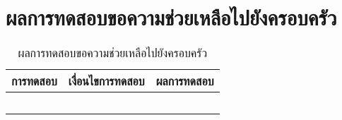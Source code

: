 \section{ผลการทดสอบขอความช่วยเหลือไปยังครอบครัว}
\begin{table}[H]
	\caption{ผลการทดสอบขอความช่วยเหลือไปยังครอบครัว}
    \centering	
	\label{tab:test14}
    \begin{tabular}{ | p{4cm} | p{4cm} | p{4cm} |  }
		\hline
	\multicolumn{1}{|c|}{การทดสอบ} & \multicolumn{1}{c|}{เงื่อนไขการทดสอบ} & \multicolumn{1}{c|}{ผลการทดสอบ} \\ \hline
	\setstretch{1.0}{ทดสอบขอความช่วยเหลือไปยังครอบครัว}
	& \setstretch{1.0}{ผู้ใช้ขอความช่วยเหลือไปยังครอบครัว}
	& \setstretch{1.0}{ระบบแสดงหน้าขอความช่วยเหลือครอบครัว} \\ \cline{2-3} 
	& \setstretch{1.0}{ผู้ใช้เลือกปุ่มโทรหาสมาชิกในครอบครัว และสมาชิกมีข้อมูลเบอร์โทรศัพท์}
	& \setstretch{1.0}{ระบบจะเรียกใช้งานการโทรของมือถือผู้ใช้พร้อมกับเบอร์ของสมาชิก } \\ \cline{2-3} 
	& \setstretch{1.0}{ผู้ใช้เลือกปุ่มโทรหาสมาชิกในครอบครัว และสมาชิกไม่มีข้อมูลเบอร์โทรศัพท์}
	& \setstretch{1.0}{ระบบแสดงข้อความ  สมาชิกไม่ได้ระบุเบอร์โทรศัพท์  }\\ \cline{2-3} 
	& \setstretch{1.0}{ผู้ใช้เลือกปุ่มส่งข้อความหาสมาชิกในครอบครัว และสมาชิกมีข้อมูลเบอร์โทรศัพท์}
	& \setstretch{1.0}{ระบบจะเรียกใช้งานการส่งข้อความของมือถือผู้ใช้พร้อมกับเบอร์ของสมาชิก และข้อความขอความช่วยเหลือ } \\ \cline{2-3} 
	& \setstretch{1.0}{ผู้ใช้เลือกปุ่มส่งข้อความหาสมาชิกในครอบครัว และสมาชิกไม่มีข้อมูลเบอร์โทรศัพท์}
	& \setstretch{1.0}{ระบบแสดงข้อความ  สมาชิกไม่ได้ระบุเบอร์โทรศัพท์  } \\ \hline
    \end{tabular}
\end{table}

